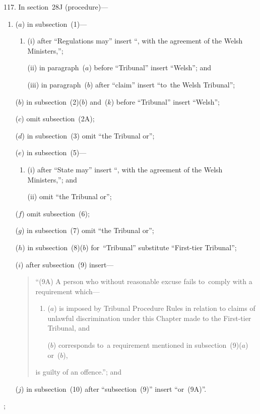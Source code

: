 \documentclass[12pt,a4paper]{article}
\begin{document}
117.  In section~28J (procedure)—
\begin{enumerate}\item[]
($a$) in subsection~(1)—
\begin{enumerate}\item[]
(i) after “Regulations may” insert “, with the agreement of the Welsh Ministers,”;

(ii) in paragraph~($a$)  before “Tribunal” insert “Welsh”; and

(iii) in paragraph~($b$)  after “claim” insert “to~the Welsh Tribunal”;
\end{enumerate}

($b$) in subsection~(2)($b$)  and~($k$)  before “Tribunal” insert “Welsh”;

($c$) omit subsection~(2A);

($d$) in subsection~(3) omit “the Tribunal or”;

($e$) in subsection~(5)—
\begin{enumerate}\item[]
(i) after “State may” insert “, with the agreement of the Welsh Ministers,”; and

(ii) omit “the Tribunal or”;
\end{enumerate}

($f$) omit subsection~(6);

($g$) in subsection~(7) omit “the Tribunal or”;

($h$) in subsection~(8)($b$)  for~“Tribunal” substitute “First-tier Tribunal”;

($i$) after subsection~(9) insert—
\begin{quotation}
“(9A) A person who without reasonable excuse fails to~comply with a requirement which—
\begin{enumerate}\item[]
($a$) is imposed by Tribunal Procedure Rules in relation to claims of unlawful discrimination under this Chapter made to the First-tier Tribunal, and

\begin{sloppypar}
($b$) corresponds to~a requirement mentioned in subsection~(9)($a$)  or~($b$),
\end{sloppypar}
\end{enumerate}
is guilty of an offence.”; and
\end{quotation}

($j$) in subsection~(10) after “subsection~(9)” insert “or~(9A)”.
\end{enumerate};
\end{document}
